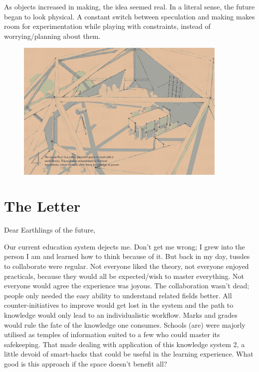 \documentclass[a4paper,7pt]{article}
\begin{document}
As objects increased in making, the idea seemed real. In a literal sense, the future began to look physical. A constant switch between speculation and making makes room for experimentation while playing with constraints, instead of worrying/planning about them.

\begin{figure}[h]
  \center
  \includegraphics[width=0.9\textwidth]{discoverdrome_4.png}
\end{figure}

\section{The Letter}

Dear Earthlings of the future,

Our current education system dejects me. Don’t get me wrong; I grew into the person I am and learned how to think because of it. But back in my day, tussles to collaborate were regular. Not everyone liked the theory, not everyone enjoyed practicals, because they would all be expected/wish to master everything. Not everyone would agree the experience was joyous. The collaboration wasn't dead; people only needed the easy ability to understand related fields better. All counter-initiatives to improve would get lost in the system and the path to knowledge would only lead to an individualistic workflow. Marks and grades would rule the fate of the knowledge one consumes. Schools (are) were majorly utilised as temples of information suited to a few who could master its safekeeping. That made dealing with application of this knowledge system 2, a little devoid of smart-hacks that could be useful in the learning experience. What good is this approach if the space doesn’t benefit all?
\end{document}
